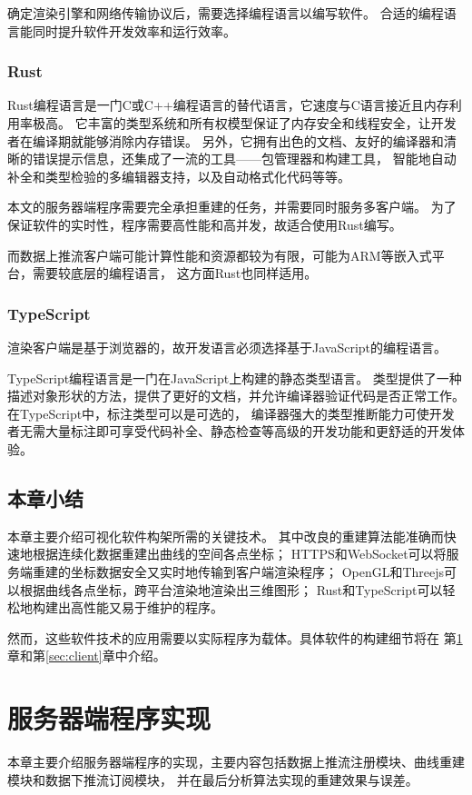 确定渲染引擎和网络传输协议后，需要选择编程语言以编写软件。
合适的编程语言能同时提升软件开发效率和运行效率。

\subsubsection{Rust}
Rust编程语言\cite{rust}是一门C或C++编程语言的替代语言，它速度与C语言接近且内存利用率极高。
它丰富的类型系统和所有权模型保证了内存安全和线程安全，让开发者在编译期就能够消除内存错误。
另外，它拥有出色的文档、友好的编译器和清晰的错误提示信息，还集成了一流的工具——包管理器和构建工具，
智能地自动补全和类型检验的多编辑器支持，以及自动格式化代码等等。

本文的服务器端程序需要完全承担重建的任务，并需要同时服务多客户端。
为了保证软件的实时性，程序需要高性能和高并发，故适合使用Rust编写。

而数据上推流客户端可能计算性能和资源都较为有限，可能为ARM等嵌入式平台，需要较底层的编程语言，
这方面Rust也同样适用。

\subsubsection{TypeScript}
渲染客户端是基于浏览器的，故开发语言必须选择基于JavaScript的编程语言。

TypeScript编程语言\cite{typescript}是一门在JavaScript上构建的静态类型语言。
类型提供了一种描述对象形状的方法，提供了更好的文档，并允许编译器验证代码是否正常工作。
在TypeScript中，标注类型可以是可选的，
编译器强大的类型推断能力可使开发者无需大量标注即可享受代码补全、静态检查等高级的开发功能和更舒适的开发体验。

\subsection{本章小结}
本章主要介绍可视化软件构架所需的关键技术。
其中改良的重建算法能准确而快速地根据连续化数据重建出曲线的空间各点坐标；
HTTPS和WebSocket可以将服务端重建的坐标数据安全又实时地传输到客户端渲染程序；
OpenGL和Threejs可以根据曲线各点坐标，跨平台渲染地渲染出三维图形；
Rust和TypeScript可以轻松地构建出高性能又易于维护的程序。

然而，这些软件技术的应用需要以实际程序为载体。具体软件的构建细节将在
第\ref{sec:server}章和第\ref{sec:client}章中介绍。

\clearpage

\section{服务器端程序实现}
\label{sec:server}
本章主要介绍服务器端程序的实现，主要内容包括数据上推流注册模块、曲线重建模块和数据下推流订阅模块，
并在最后分析算法实现的重建效果与误差。
 
